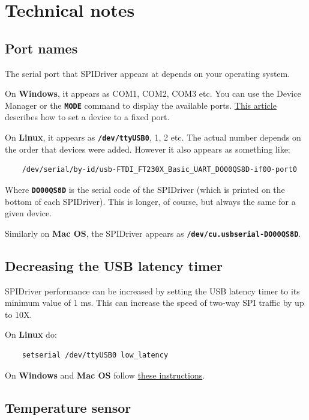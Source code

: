 \documentclass{article}
\newcommand{\mach}[1]{\texttt{\textbf{#1}}}
\begin{document}
\newpage
\section{Technical notes}

\subsection{Port names}

The serial port that SPIDriver appears at depends on your operating system.

On \textbf{Windows}, it appears as COM1, COM2, COM3 etc.
You can use the Device Manager or the \mach{MODE} command to display the available ports.
\href{https://plugable.com/2011/07/04/how-to-change-the-com-port-for-a-usb-serial-adapter-on-windows-7/}{This article}
describes how to set a device to a fixed port.

On \textbf{Linux}, it appears as \mach{/dev/ttyUSB0}, 1, 2 etc.
The actual number depends on the order that devices were added.
However it also appears as something like:
\begin{lstlisting}
    /dev/serial/by-id/usb-FTDI_FT230X_Basic_UART_DO00QS8D-if00-port0
\end{lstlisting}
Where \mach{DO00QS8D} is the serial code of the SPIDriver (which is printed on the bottom of each SPIDriver).
This is longer, of course, but always the same for a given device.

Similarly on \textbf{Mac OS}, the SPIDriver appears as \mach{/dev/cu.usbserial-DO00QS8D}.

\subsection{Decreasing the USB latency timer}

SPIDriver performance can be increased by setting the USB latency timer to its minimum value of 1 ms.
This can increase the speed of two-way SPI traffic by up to 10X.

On \textbf{Linux} do:

\begin{lstlisting}
    setserial /dev/ttyUSB0 low_latency
\end{lstlisting}

On \textbf{Windows} and \textbf{Mac OS} follow
\href{https://projectgus.com/2011/10/notes-on-ftdi-latency-with-arduino/}{these instructions}.

\subsection{Temperature sensor}
\end{document}
